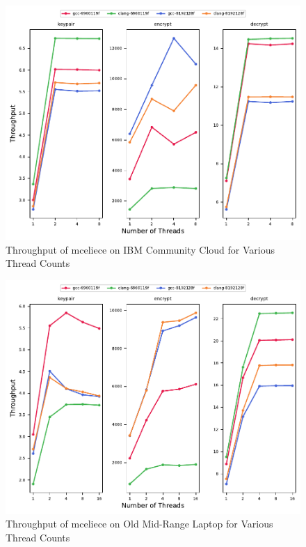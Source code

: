 \begin{figure}
    \centering
    \includegraphics[scale=0.75]{chapters/results/throughput/IBM Community Cloud_mceliece.pdf}
    \caption{Throughput of \gls{mceliece} on IBM Community Cloud for Various Thread Counts}
    \label{figure:results:throughput:mceliece-ibm-community-cloud}
\end{figure} 

\begin{figure}
    \centering
    \includegraphics[scale=0.75]{chapters/results/throughput/Old Mid-Range Laptop_mceliece.pdf}
    \caption{Throughput of \gls{mceliece} on Old Mid-Range Laptop for Various Thread Counts}
    \label{figure:results:throughput:mceliece-old-mid-range-laptop}
\end{figure}

